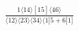 \documentclass[varwidth, border=5pt]{standalone}
\begin{document}
\begin{my}
$\begin{gathered}
\scriptscriptstyle\frac{1⟨14⟩[15]⟨46⟩}{⟨12⟩⟨23⟩⟨34⟩⟨1|5+6|1]}
\end{gathered}$
\end{my}
\end{document}
